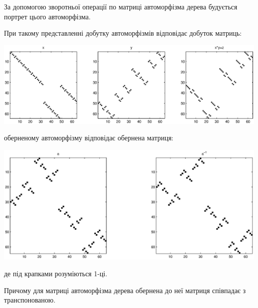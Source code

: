 \documentclass[a4paper,12pt]{article} \usepackage{a4wide}
\numberwithin{equation}{subsection}
\begin{document}
 За допомогою зворотньої операції по матриці автоморфізма дерева будується портрет цього автоморфізма.



При такому представленні добутку автоморфізмів відповідає добуток матриць:
\begin{center}
\includegraphics[scale=0.55]{matrprod.eps}
\end{center}
оберненому автоморфізму відповідає обернена матриця:
\begin{center}
\includegraphics[scale=0.5]{matrinv.eps}
\end{center}
де під крапками розуміються 1-ці.

 Причому для матриці автоморфізма дерева обернена до неї матриця співпадає з транспонованою.
\end{document}
